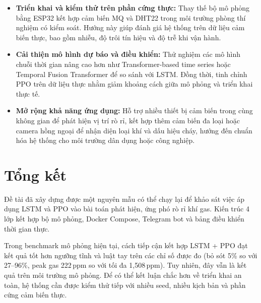 \begin{itemize}
  \item \textbf{Triển khai và kiểm thử trên phần cứng thực:} Thay thế bộ mô phỏng bằng ESP32 kết hợp cảm biến MQ và DHT22 trong môi trường phòng thí nghiệm có kiểm soát. Hướng này giúp đánh giá hệ thống trên dữ liệu cảm biến thực, bao gồm nhiễu, độ trôi tín hiệu và độ trễ khi vận hành.

  \item \textbf{Cải thiện mô hình dự báo và điều khiển:} Thử nghiệm các mô hình chuỗi thời gian nâng cao hơn như Transformer-based time series hoặc Temporal Fusion Transformer để so sánh với LSTM. Đồng thời, tinh chỉnh PPO trên dữ liệu thực nhằm giảm khoảng cách giữa mô phỏng và triển khai thực tế.

  \item \textbf{Mở rộng khả năng ứng dụng:} Hỗ trợ nhiều thiết bị cảm biến trong cùng không gian để phát hiện vị trí rò rỉ, kết hợp thêm cảm biến đa loại hoặc camera hồng ngoại để nhận diện loại khí và dấu hiệu cháy, hướng đến chuẩn hóa hệ thống cho môi trường dân dụng hoặc công nghiệp.
\end{itemize}

\section{Tổng kết}

Đề tài đã xây dựng được một nguyên mẫu có thể chạy lại để khảo sát việc áp dụng LSTM và PPO vào bài toán phát hiện, ứng phó rò rỉ khí gas. Kiến trúc 4 lớp kết hợp bộ mô phỏng, Docker Compose, Telegram bot và bảng điều khiển thời gian thực.

Trong benchmark mô phỏng hiện tại, cách tiếp cận kết hợp LSTM + PPO đạt kết quả tốt hơn ngưỡng tĩnh và luật tay trên các chỉ số được đo (bỏ sót 5\% so với 27--96\%, peak gas 222\,ppm so với tối đa 1{,}508\,ppm). Tuy nhiên, đây vẫn là kết quả trên môi trường mô phỏng. Để có thể kết luận chắc hơn về triển khai an toàn, hệ thống cần được kiểm thử tiếp với nhiều seed, nhiều kịch bản và phần cứng cảm biến thực.
